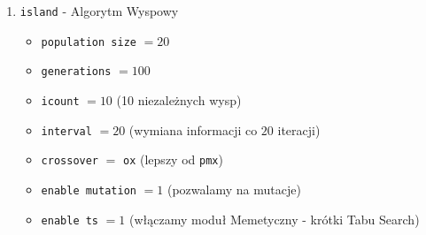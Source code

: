 \begin{enumerate}
\begin{itemize}
        \item \texttt{enable ts} $= 1$ (włączamy moduł Memetyczny - krótki Tabu Search)
    \end{itemize}
    \item \texttt{island} -  Algorytm Wyspowy
    \begin{itemize}
        \item \texttt{population size} $= 20$
        \item \texttt{generations} $= 100$
        \item \texttt{icount} $= 10$ (10 niezależnych wysp)
        \item \texttt{interval} $= 20$ (wymiana informacji co $20$ iteracji)
        \item \texttt{crossover} $=$ \texttt{ox} (lepszy od \texttt{pmx})
        \item \texttt{enable mutation} $= 1$ (pozwalamy na mutacje)
        \item \texttt{enable ts} $= 1$ (włączamy moduł Memetyczny - krótki Tabu Search)
    \end{itemize}
\end{enumerate}
